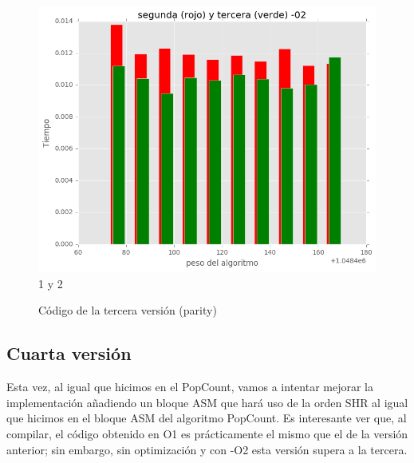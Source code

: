 \documentclass[a4paper, 11pt]{article}
\begin{document}
\begin{figure}[!hbp]
	\includegraphics[scale=0.6]{2y3_2p.png}
	\caption{1 y 2	\label{2y3p_2}}
\end{figure} 
\begin{figure}[!hbp]
	
	\caption{Código de la tercera versión (parity) 	\label{parity tercera versión}}
\end{figure}

\pagebreak
\subsection{Cuarta versión}
Esta vez, al igual que hicimos en el PopCount, vamos a intentar mejorar la implementación añadiendo un bloque ASM que hará uso de la orden SHR al igual que hicimos en el bloque ASM del algoritmo PopCount. Es interesante ver que, al compilar, el código obtenido en O1 es prácticamente el mismo que el de la versión anterior; sin embargo, sin optimización y con -O2 esta versión supera a la tercera.
\end{document}
